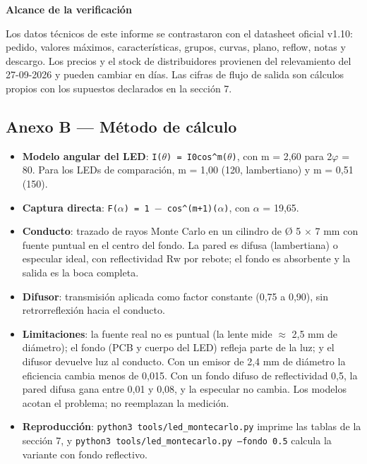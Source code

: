\documentclass[11pt,a4paper]{article}
\newenvironment{notadato}[1]
  {\begin{notadatobase}{\sffamily\scriptsize\bfseries\color{navy}#1}\par\vspace{2pt}}
  {\end{notadatobase}}
\begin{document}
\begin{notadato}{Alcance de la verificación}
Los datos técnicos de este informe se contrastaron con el datasheet oficial v1.10: pedido, valores máximos, características, grupos, curvas, plano, reflow, notas y descargo. Los precios y el stock de distribuidores provienen del relevamiento del 27-09-2026 y pueden cambiar en días. Las cifras de flujo de salida son cálculos propios con los supuestos declarados en la sección 7.

\end{notadato}

\subsection*{Anexo B — Método de cálculo}

\begin{itemize}
\item \textbf{Modelo angular del LED}: \texttt{I($\theta$) = I0\textperiodcentered{}cos\textasciicircum{}m($\theta$)}, con m = 2,60 para 2$\varphi$ = 80\textdegree{}. Para los LEDs de comparación, m = 1,00 (120\textdegree{}, lambertiano) y m = 0,51 (150\textdegree{}).
\item \textbf{Captura directa}: \texttt{F($\alpha$) = 1 $-$ cos\textasciicircum{}(m+1)($\alpha$)}, con $\alpha$ = 19,65\textdegree{}.
\item \textbf{Conducto}: trazado de rayos Monte Carlo en un cilindro de Ø 5 $\times$ 7 mm con fuente puntual en el centro del fondo. La pared es difusa (lambertiana) o especular ideal, con reflectividad Rw por rebote; el fondo es absorbente y la salida es la boca completa.
\item \textbf{Difusor}: transmisión aplicada como factor constante (0,75 a 0,90), sin retrorreflexión hacia el conducto.
\item \textbf{Limitaciones}: la fuente real no es puntual (la lente mide $\approx$ 2,5 mm de diámetro); el fondo (PCB y cuerpo del LED) refleja parte de la luz; y el difusor devuelve luz al conducto. Con un emisor de 2,4 mm de diámetro la eficiencia cambia menos de 0,015. Con un fondo difuso de reflectividad 0,5, la pared difusa gana entre 0,01 y 0,08, y la especular no cambia. Los modelos acotan el problema; no reemplazan la medición.
\item \textbf{Reproducción}: \texttt{python3 tools/led\_montecarlo.py} imprime las tablas de la sección 7, y \texttt{python3 tools/led\_montecarlo.py --fondo 0.5} calcula la variante con fondo reflectivo.
\end{itemize}
\end{document}
